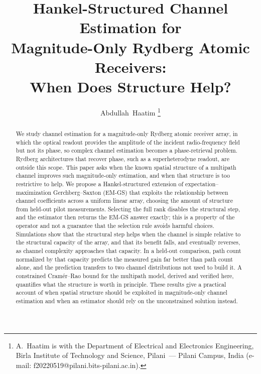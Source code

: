 \documentclass[journal]{IEEEtran}
\begin{document}
\title{Hankel-Structured Channel Estimation for\\
Magnitude-Only Rydberg Atomic Receivers:\\
When Does Structure Help?}

\author{Abdullah~Haatim%
\thanks{A.~Haatim is with the Department of Electrical and Electronics
Engineering, Birla Institute of Technology and Science, Pilani~--- Pilani
Campus, India (e-mail: f20220519@pilani.bits-pilani.ac.in).}}

\maketitle

\begin{abstract}
We study channel estimation for a magnitude-only Rydberg atomic receiver array,
in which the optical readout provides the amplitude of the incident
radio-frequency field but not its phase, so complex channel estimation becomes
a phase-retrieval problem. Rydberg architectures that recover phase, such as a
superheterodyne readout, are outside this scope. This paper asks when the known
spatial structure of a multipath channel improves such magnitude-only
estimation, and when that structure is too restrictive to help. We propose a
Hankel-structured extension of expectation--maximization Gerchberg--Saxton
(EM-GS) that exploits the relationship between channel coefficients across a
uniform linear array, choosing the amount of structure from held-out pilot
measurements. Selecting the full rank disables the structural step, and the
estimator then returns the EM-GS answer exactly; this is a property of the
operator and not a guarantee that the selection rule avoids harmful choices.
Simulations show that the structural step helps when the channel is simple
relative to the structural capacity of the array, and that its benefit falls,
and eventually reverses, as channel complexity approaches that capacity. In a
held-out comparison, path count normalized by that capacity predicts the
measured gain far better than path count alone, and the prediction transfers to
two channel distributions not used to build it. A constrained Cram\'er--Rao
bound for the multipath model, derived and verified here, quantifies what the
structure is worth in principle. These results give a practical account of when
spatial structure should be exploited in magnitude-only channel estimation and
when an estimator should rely on the unconstrained solution instead.
\end{abstract}
\end{document}
